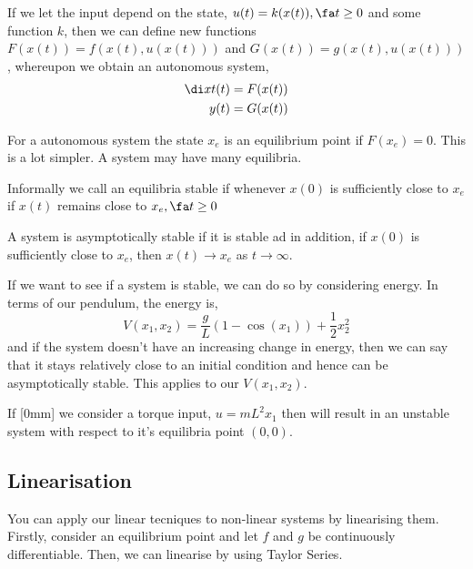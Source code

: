 If we let the input depend on the state, $u(t) = k(x(t)), \fa t \ge 0$ and some function $k$, then we can define new functions $F(x(t)) = f(x(t), u(x(t)))$ and $G(x(t)) = g(x(t), u(x(t)))$, whereupon we obtain an autonomous system,
\begin{align*}
  \di x t (t) &= F(x(t))\\
  y(t) &= G(x(t))
\end{align*}

For a autonomous system the state $x_e$ is an equilibrium point if $F(x_e) = 0$. This is a lot simpler. A system may have many equilibria.

\begin{ndefi}[Stability]
  Informally we call an equilibria stable if whenever $x(0)$ is sufficiently close to $x_e$ if $x(t)$ remains close to $x_e, \fa t \ge 0$
\end{ndefi}

\begin{ndefi}
  A system is asymptotically stable if it is stable ad in addition, if $x(0)$ is sufficiently close to $x_e$, then $x(t) \to x_e$ as $t \to \infty$.
\end{ndefi}

If we want to see if a system is stable, we can do so by considering energy. In terms of our pendulum, the energy is,
$$ V(x_1, x_2) = \frac{g}{L}(1 - \cos(x_1)) + \frac{1}{2}x_2^2 $$
and if the system doesn't have an increasing change in energy, then we can say that it stays relatively close to an initial condition and hence can be asymptotically stable. This applies to our $V(x_1, x_2)$.

If [0mm] we consider a torque input, $u = mL^2x_1$ then will result in an unstable system with respect to it's equilibria point $(0, 0)$.

\subsection{Linearisation}
You can apply our linear tecniques to non-linear systems by linearising them. Firstly, consider an equilibrium point and let $f$ and $g$ be continuously differentiable. Then, we can linearise by using Taylor Series.\\

